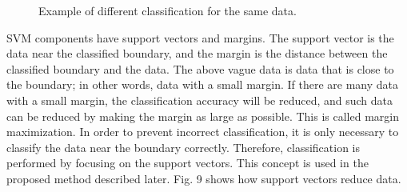 \begin{figure}[t]
  \begin{center}
\end{center}
\caption{Example of different classification for the same data.}
\vspace*{-3pt}
\end{figure}
SVM components have support vectors and margins. The support vector is the data near the classified boundary, and the margin is the distance between the classified boundary and the data. The above vague data is data that is close to the boundary; in other words, data with a small margin. If there are many data with a small margin, the classification accuracy will be reduced, and such data can be reduced by making the margin as large as possible. This is called margin maximization. In order to prevent incorrect classification, it is only necessary to classify the data near the boundary correctly. Therefore, classification is performed by focusing on the support vectors. This concept is used in the proposed method described later. Fig. 9 shows how support vectors reduce data.
